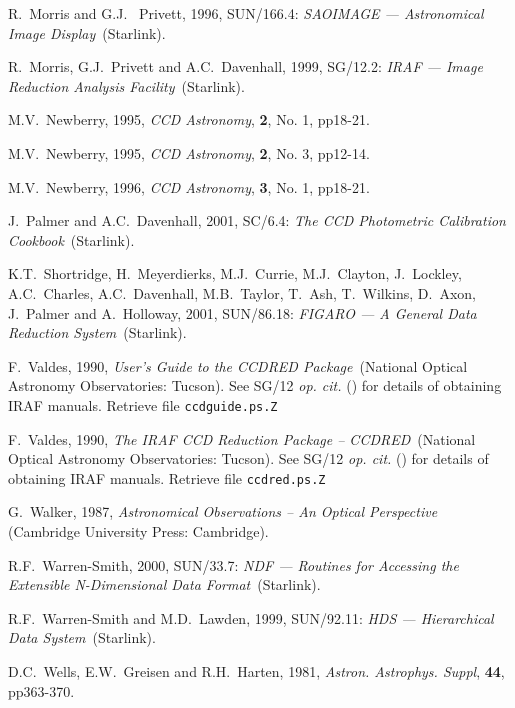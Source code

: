 \documentclass[twoside,11pt]{article}
\newcommand{\xref}[3]{#1}
\begin{document}
\begin{thebibliography}{99}
   R.~Morris and G.J.~ Privett, 1996,
   \xref{SUN/166.4}{sun166}{}: {\it SAOIMAGE --- Astronomical Image
   Display}\, (Starlink).

   R.~Morris, G.J.~Privett and A.C.~Davenhall, 1999,
   \xref{SG/12.2}{sg12}{}: {\it IRAF --- Image Reduction Analysis Facility}\,
   (Starlink).

   M.V.~Newberry, 1995, {\it CCD Astronomy},
   {\bf 2}, No. 1, pp18-21.

   M.V.~Newberry, 1995, {\it CCD Astronomy},
   {\bf 2}, No. 3, pp12-14.

   M.V.~Newberry, 1996, {\it CCD Astronomy},
   {\bf 3}, No. 1, pp18-21.

   J.~Palmer and A.C.~Davenhall, 2001, \xref{SC/6.4}{sc6}{}:
   {\it The CCD Photometric Calibration Cookbook}\, (Starlink).

   K.T.~Shortridge, H.~Meyerdierks, M.J.~Currie,
   M.J.~Clayton, J.~Lockley, A.C.~Charles, A.C.~Davenhall, M.B.~Taylor,
   T.~Ash, T.~Wilkins, D.~Axon, J.~Palmer and A.~Holloway,
   2001, \xref{SUN/86.18}{sun86}{}: {\it FIGARO --- A General Data
   Reduction System}\, (Starlink).

   F.~Valdes, 1990, {\it User's Guide to the CCDRED
   Package}\, (National Optical Astronomy Observatories: Tucson).  See
   \xref{SG/12}{sg12}{} {\it op. cit.}\/ (\cite{SG12}) for details of
   obtaining IRAF manuals.  Retrieve file {\tt ccdguide.ps.Z}

   F.~Valdes, 1990, {\it The IRAF CCD Reduction
   Package -- CCDRED}\, (National Optical Astronomy Observatories: Tucson).
   See \xref{SG/12}{sg12}{} {\it op. cit.}\/ (\cite{SG12}) for details of
   obtaining IRAF manuals.  Retrieve file {\tt ccdred.ps.Z}

   G.~Walker, 1987, {\it Astronomical Observations
   -- An Optical Perspective}\, (Cambridge University Press: Cambridge).

   R.F.~Warren-Smith, 2000, \xref{SUN/33.7}{sun33}{}: {\it
   NDF --- Routines for Accessing the Extensible N-Dimensional Data
   Format}\, (Starlink).

   R.F.~Warren-Smith and M.D.~Lawden, 1999,
   \xref{SUN/92.11}{sun92}{}: {\it HDS --- Hierarchical Data System}\,
   (Starlink).

   D.C.~Wells, E.W.~Greisen and R.H.~Harten, 1981,
   {\it Astron. Astrophys. Suppl}, {\bf 44}, pp363-370.


\end{thebibliography}
\end{document}
